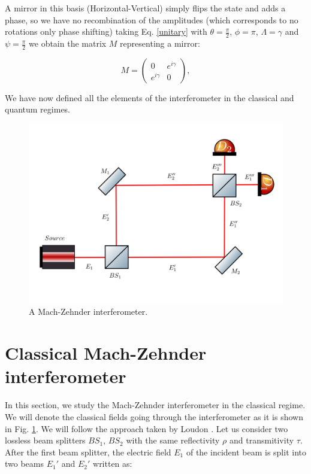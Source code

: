 \documentclass[12pt]{book}
\begin{document}
 A mirror in this basis (Horizontal-Vertical) simply flips the state and adds a phase, so we have no recombination of the amplitudes (which corresponds to no rotations only phase shifting) taking Eq. \ref{unitary} with $\theta=\frac{\pi}{2}$, $\phi=\pi$, $\Lambda=\gamma$ and $\psi= \frac{\pi}{2} $ we obtain the matrix $M$ representing a mirror:

 
\begin{equation}
M=\begin{pmatrix} 0& e^{i\gamma}  \\ e^{i\gamma} & 0 \end{pmatrix}, \label{mirror}
\end{equation}


 We have now defined all the elements of the interferometer in the classical and quantum regimes.

\begin{figure}[H]
\centering
\includegraphics[width=\linewidth]{images/machzenhdercla.png}
\caption{A Mach-Zehnder interferometer.}
\label{fig:classical mach}
\end{figure}



\section{Classical Mach-Zehnder interferometer}

In this section, we study the Mach-Zehnder interferometer in the classical regime. We will denote the classical fields going through the interferometer as it is shown in Fig. \ref{fig:classical mach}. We will follow the approach taken by Loudon \cite{ludon}. Let us consider two lossless beam splitters   $BS_{1}$, $BS_{2}$ with the same reflectivity $\rho$ and transmitivity $\tau$. After the first beam splitter, the electric field $E_{1}$ of the incident beam is split into two beams $E_{1}'$ and $E_{2}'$ written as:
\end{document}
